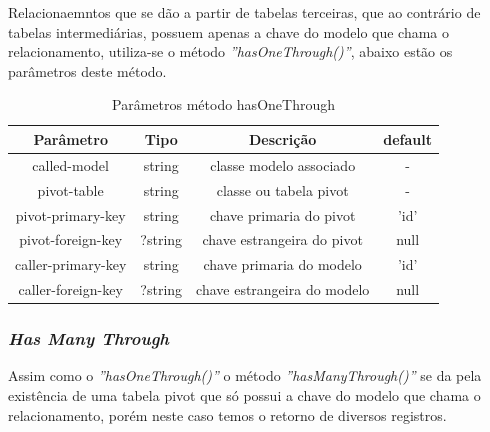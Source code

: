 Relacionaemntos que se dão a partir de tabelas terceiras, que ao contrário de tabelas intermediárias, possuem apenas a chave do modelo que chama o relacionamento, utiliza-se o método \textit{''hasOneThrough()''}, abaixo estão os parâmetros deste método.

\begin{table}[H]
\centering
\vspace{0.5cm}
\begin{tabular}{|c|c|c|c|}
\hline  
Parâmetro & Tipo & Descrição & default\\
\hline 
called-model       & string  & classe modelo associado               & -    \\
pivot-table        & string  & classe ou tabela pivot                & -    \\
pivot-primary-key & string  & chave primaria do pivot                & 'id' \\
pivot-foreign-key & ?string & chave estrangeira do pivot             & null \\
caller-primary-key & string  & chave primaria do modelo              & 'id' \\
caller-foreign-key & ?string & chave estrangeira do modelo           & null \\    
\hline
\end{tabular}
\caption{Parâmetros método hasOneThrough}
\end{table}

\spaceH{}

\label{scripts/relation_has_one_through.php}

\subsubsection{\textit{Has Many Through}}

Assim como o \textit{''hasOneThrough()''} o método \textit{''hasManyThrough()''} se da pela existência de uma tabela pivot que só possui a chave do modelo que chama o relacionamento, porém neste caso temos o retorno de diversos registros.

